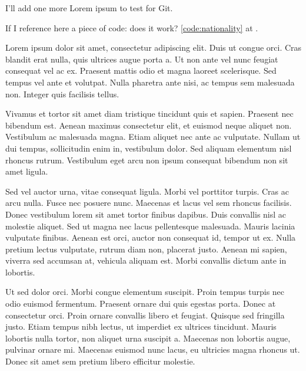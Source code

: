 

\label{chap:introduction}

I'll add one more Lorem ipsum to test for Git.

If I reference here a piece of code: does it work? \ref{code:nationality} at \pageref{code:nationality}.

Lorem ipsum dolor sit amet, consectetur adipiscing elit. Duis ut congue orci. Cras blandit erat nulla, quis ultrices augue porta a. Ut non ante vel nunc feugiat consequat vel ac ex. Praesent mattis odio et magna laoreet scelerisque. Sed tempus vel ante et volutpat. Nulla pharetra ante nisi, ac tempus sem malesuada non. Integer quis facilisis tellus.

Vivamus et tortor sit amet diam tristique tincidunt quis et sapien. Praesent nec bibendum est. Aenean maximus consectetur elit, et euismod neque aliquet non. Vestibulum ac malesuada magna. Etiam aliquet nec ante ac vulputate. Nullam ut dui tempus, sollicitudin enim in, vestibulum dolor. Sed aliquam elementum nisl rhoncus rutrum. Vestibulum eget arcu non ipsum consequat bibendum non sit amet ligula.

Sed vel auctor urna, vitae consequat ligula. Morbi vel porttitor turpis. Cras ac arcu nulla. Fusce nec posuere nunc. Maecenas et lacus vel sem rhoncus facilisis. Donec vestibulum lorem sit amet tortor finibus dapibus. Duis convallis nisl ac molestie aliquet. Sed ut magna nec lacus pellentesque malesuada. Mauris lacinia vulputate finibus. Aenean est orci, auctor non consequat id, tempor ut ex. Nulla pretium lectus vulputate, rutrum diam non, placerat justo. Aenean mi sapien, viverra sed accumsan at, vehicula aliquam est. Morbi convallis dictum ante in lobortis.

Ut sed dolor orci. Morbi congue elementum suscipit. Proin tempus turpis nec odio euismod fermentum. Praesent ornare dui quis egestas porta. Donec at consectetur orci. Proin ornare convallis libero et feugiat. Quisque sed fringilla justo. Etiam tempus nibh lectus, ut imperdiet ex ultrices tincidunt. Mauris lobortis nulla tortor, non aliquet urna suscipit a. Maecenas non lobortis augue, pulvinar ornare mi. Maecenas euismod nunc lacus, eu ultricies magna rhoncus ut. Donec sit amet sem pretium libero efficitur molestie.

